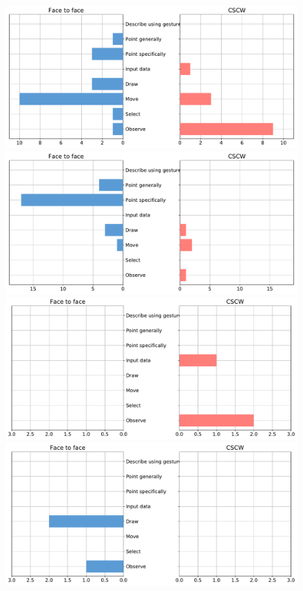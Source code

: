 \documentclass[12pt,twoside]{article}
\begin{document}
\begin{figure}
  \includegraphics[width=\linewidth]{img/Object.pdf}
  \includegraphics[width=\linewidth]{img/Position.pdf}
  \includegraphics[width=\linewidth]{img/Time.pdf}
\endminipage\hfill
{}
  \includegraphics[width=\linewidth]{img/Scale.pdf}

\end{figure}
\end{document}
